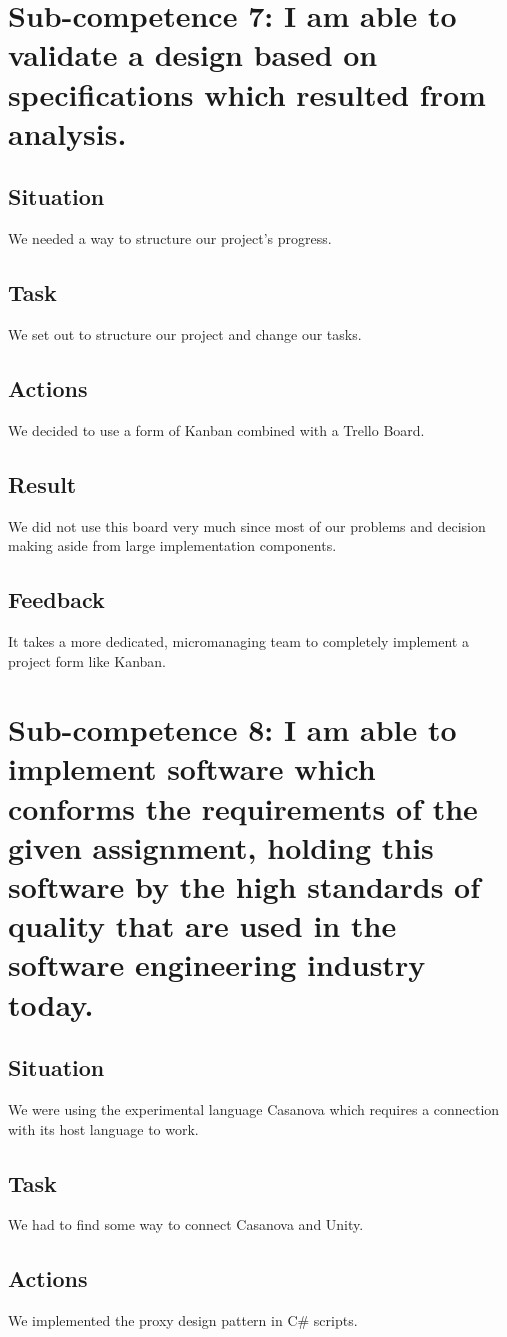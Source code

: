 \documentclass[11pt]{article}
\begin{document}
\newpage
\section{Sub-competence 7:  I am able to validate a design
based on specifications which
resulted from analysis. } 
\subsection{Situation}
We needed a way to structure our project's progress.
\subsection{Task}
We set out to structure our project and change our tasks.
\subsection{Actions}
We decided to use a form of Kanban combined with a Trello Board.
\subsection{Result}
We did not use this board very much since most of our problems and decision making aside from large implementation components.
\subsection{Feedback}
It takes a more dedicated, micromanaging team to completely implement a project form like Kanban.


\newpage
\section{Sub-competence 8:   I am able to implement software
which conforms the requirements
of the given assignment,
holding this software
by the high standards of
quality that are used in the
software engineering industry
today. } 
\subsection{Situation}
We were using the experimental language Casanova which requires a connection with its host language to work.
\subsection{Task}
We had to find some way to connect Casanova and Unity.
\subsection{Actions}
We implemented the proxy design pattern in C\# scripts.
\end{document}
